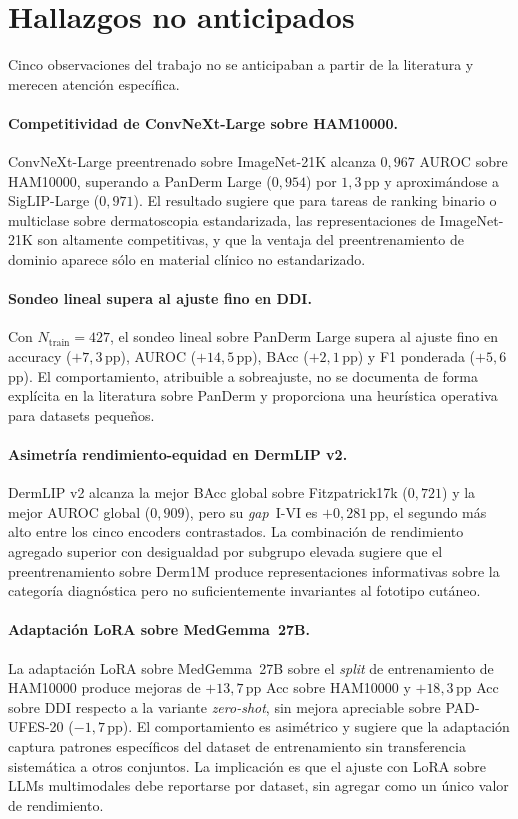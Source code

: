 \section{Hallazgos no anticipados}
\label{sec:hallazgos}

Cinco observaciones del trabajo no se anticipaban a partir de la
literatura y merecen atención específica.

\paragraph{Competitividad de ConvNeXt-Large sobre HAM10000.}
ConvNeXt-Large preentrenado sobre ImageNet-21K alcanza
$0{,}967$ AUROC sobre HAM10000, superando a PanDerm Large
($0{,}954$) por $1{,}3$\,pp y aproximándose a SigLIP-Large
($0{,}971$). El resultado sugiere que para tareas de ranking
binario o multiclase sobre dermatoscopia estandarizada, las
representaciones de ImageNet-21K son altamente competitivas, y
que la ventaja del preentrenamiento de dominio aparece sólo en
material clínico no estandarizado.

\paragraph{Sondeo lineal supera al ajuste fino en DDI.}
Con $N_{\mathrm{train}} = 427$, el sondeo lineal sobre PanDerm
Large supera al ajuste fino en accuracy ($+7{,}3$\,pp), AUROC
($+14{,}5$\,pp), BAcc ($+2{,}1$\,pp) y F1 ponderada
($+5{,}6$\,pp). El comportamiento, atribuible a sobreajuste,
no se documenta de forma explícita en la literatura sobre PanDerm
y proporciona una heurística operativa para datasets pequeños.

\paragraph{Asimetría rendimiento-equidad en DermLIP v2.}
DermLIP v2 alcanza la mejor BAcc global sobre Fitzpatrick17k
($0{,}721$) y la mejor AUROC global ($0{,}909$), pero su
\emph{gap}~I-VI es $+0{,}281$\,pp, el segundo más alto entre
los cinco encoders contrastados. La combinación de rendimiento
agregado superior con desigualdad por subgrupo elevada sugiere que
el preentrenamiento sobre Derm1M produce representaciones
informativas sobre la categoría diagnóstica pero no
suficientemente invariantes al fototipo cutáneo.

\paragraph{Adaptación LoRA sobre MedGemma~27B.}
La adaptación LoRA sobre MedGemma~27B sobre el \emph{split} de
entrenamiento de HAM10000 produce mejoras de $+13{,}7$\,pp Acc
sobre HAM10000 y $+18{,}3$\,pp Acc sobre DDI respecto a la
variante \emph{zero-shot}, sin mejora apreciable sobre PAD-UFES-20
($-1{,}7$\,pp). El comportamiento es asimétrico y sugiere que
la adaptación captura patrones específicos del dataset de
entrenamiento sin transferencia sistemática a otros conjuntos. La
implicación es que el ajuste con LoRA sobre LLMs multimodales
debe reportarse por dataset, sin agregar como un único valor de
rendimiento.

